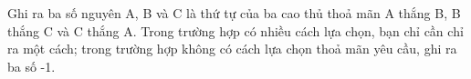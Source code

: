 Ghi ra ba số nguyên A, B và C là thứ tự của ba cao thủ thoả mãn A thắng B, B thắng C và C thắng A. Trong trường hợp có nhiều cách lựa chọn, bạn chỉ cần chỉ ra một cách; trong trường hợp không có cách lựa chọn thoả mãn yêu cầu, ghi ra ba số -1.